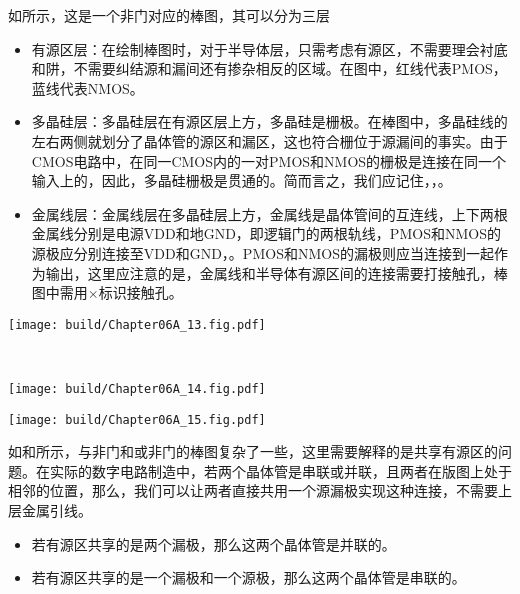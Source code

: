 如所示，这是一个非门对应的棒图，其可以分为三层
\begin{itemize}
    \item 有源区层：在绘制棒图时，对于半导体层，只需考虑有源区，不需要理会衬底和阱，不需要纠结源和漏间还有掺杂相反的区域。在图中，红线代表PMOS，蓝线代表NMOS。
    \item 多晶硅层：多晶硅层在有源区层上方，多晶硅是栅极。在棒图中，多晶硅线的左右两侧就划分了晶体管的源区和漏区，这也符合栅位于源漏间的事实。由于CMOS电路中，在同一CMOS内的一对PMOS和NMOS的栅极是连接在同一个输入上的，因此，多晶硅栅极是贯通的。简而言之，我们应记住，，。
    \item 金属线层：金属线层在多晶硅层上方，金属线是晶体管间的互连线，上下两根金属线分别是电源VDD和地GND，即逻辑门的两根轨线，PMOS和NMOS的源极应分别连接至VDD和GND，。PMOS和NMOS的漏极则应当连接到一起作为输出，这里应注意的是，金属线和半导体有源区间的连接需要打接触孔，棒图中需用$\times$标识接触孔。
\end{itemize}

\begin{Figure}[互补CMOS逻辑门的棒图]
    \begin{FigureSub}[非门;互补CMOS逻辑门的棒图非门]
        \texttt{[image: build/Chapter06A\_13.fig.pdf]}
    \end{FigureSub}\\ \vspace{0.5cm}
    \begin{FigureSub}
        \texttt{[image: build/Chapter06A\_14.fig.pdf]}
    \end{FigureSub}
    \hspace{0.25cm}
    \begin{FigureSub}
        \texttt{[image: build/Chapter06A\_15.fig.pdf]}
    \end{FigureSub}
\end{Figure}
如和所示，与非门和或非门的棒图复杂了一些，这里需要解释的是共享有源区的问题。在实际的数字电路制造中，若两个晶体管是串联或并联，且两者在版图上处于相邻的位置，那么，我们可以让两者直接共用一个源漏极实现这种连接，不需要上层金属引线。
\begin{itemize}
    \item 若有源区共享的是两个漏极，那么这两个晶体管是并联的。
    \item 若有源区共享的是一个漏极和一个源极，那么这两个晶体管是串联的。
\end{itemize}

